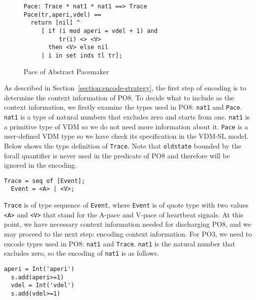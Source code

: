 \begin{figure}[t]
\begin{center}
\begin{mdframed}[roundcorner=5pt]
\begin{Verbatim}[fontsize=\small]
Pace: Trace * nat1 * nat1 ==> Trace
Pace(tr,aperi,vdel) ==
  return [nil] ^
     [ if (i mod aperi = vdel + 1) and
          tr(i) <> <V> 
       then <V> else nil
     | i in set inds tl tr];
\end{Verbatim}
\end{mdframed}
\vspace{-10pt}
\caption{Pace of Abstract Pacemaker}
\label{fig:pace_case1}
\end{center}
\vspace{-20pt}
\end{figure}

As described in Section~\ref{section:encode-strategy}, the first step of encoding is to determine the context information of PO8. To decide what to include as the context information, we firstly examine the types used in PO8: {\tt nat1} and {\tt Pace}. {\tt nat1} is a type of natural numbers that excludes zero and starts from one. {\tt nat1} is a primitive type of VDM so we do not need more information about it. {\tt Pace} is a user-defined VDM type so we have check its specification in the VDM-SL model. Below shows the type definition of {\tt Trace}. Note that {\tt oldstate} bounded by the forall quantifier is never used in the predicate of PO8 and therefore will be ignored in the encoding.

\begin{mdframed}[roundcorner=5pt]
\begin{Verbatim}[fontsize=\small]
  Trace = seq of [Event];
  Event = <A> | <V>;
\end{Verbatim}
\end{mdframed}

{\tt Trace} is of type sequence of {\tt Event}, where {\tt Event} is of quote type with two values {\tt <A>} and {\tt <V>} that stand for the A-pace and V-pace of heartbeat signals. At this point, we have necessary context information needed for discharging PO8, and we may proceed to the next step: encoding context information. For PO3, we need to encode types used in PO8: {\tt nat1} and {\tt Trace}. {\tt nat1} is the natural number that excludes zero, so the encoding of {\tt nat1} is as follows. 

\begin{mdframed}[roundcorner=5pt,shadow=true]
\begin{Verbatim}[fontsize=\small]
  aperi = Int('aperi')
  s.add(aperi>=1)
  vdel = Int('vdel')
  s.add(vdel>=1)
\end{Verbatim}
\end{mdframed}

